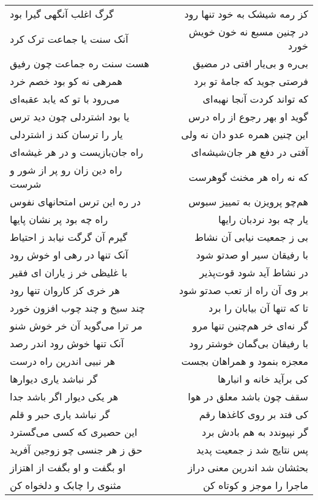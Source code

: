 \begin{center}
\begin{longtable}{l p{0.5cm} r}
\\
گرگ اغلب آنگهی گیرا بود
&&
کز رمه شیشک به خود تنها رود
\\
آنک سنت یا جماعت ترک کرد
&&
در چنین مسبع نه خون خویش خورد
\\
هست سنت ره جماعت چون رفیق
&&
بی‌ره و بی‌یار افتی در مضیق
\\
همرهی نه کو بود خصم خرد
&&
فرصتی جوید که جامهٔ تو برد
\\
می‌رود با تو که یابد عقبه‌ای
&&
که تواند کردت آنجا نهبه‌ای
\\
یا بود اشتردلی چون دید ترس
&&
گوید او بهر رجوع از راه درس
\\
یار را ترسان کند ز اشتردلی
&&
این چنین همره عدو دان نه ولی
\\
راه جان‌بازیست و در هر غیشه‌ای
&&
آفتی در دفع هر جان‌شیشه‌ای
\\
راه دین زان رو پر از شور و شرست
&&
که نه راه هر مخنث گوهرست
\\
در ره این ترس امتحانهای نفوس
&&
هم‌چو پرویزن به تمییز سبوس
\\
راه چه بود پر نشان پایها
&&
یار چه بود نردبان رایها
\\
گیرم آن گرگت نیابد ز احتیاط
&&
بی ز جمعیت نیابی آن نشاط
\\
آنک تنها در رهی او خوش رود
&&
با رفیقان سیر او صدتو شود
\\
با غلیظی خر ز یاران ای فقیر
&&
در نشاط آید شود قوت‌پذیر
\\
هر خری کز کاروان تنها رود
&&
بر وی آن راه از تعب صدتو شود
\\
چند سیخ و چند چوب افزون خورد
&&
تا که تنها آن بیابان را برد
\\
مر ترا می‌گوید آن خر خوش شنو
&&
گر نه‌ای خر هم‌چنین تنها مرو
\\
آنک تنها خوش رود اندر رصد
&&
با رفیقان بی‌گمان خوشتر رود
\\
هر نبیی اندرین راه درست
&&
معجزه بنمود و همراهان بجست
\\
گر نباشد یاری دیوارها
&&
کی برآید خانه و انبارها
\\
هر یکی دیوار اگر باشد جدا
&&
سقف چون باشد معلق در هوا
\\
گر نباشد یاری حبر و قلم
&&
کی فتد بر روی کاغذها رقم
\\
این حصیری که کسی می‌گسترد
&&
گر نپیوندد به هم بادش برد
\\
حق ز هر جنسی چو زوجین آفرید
&&
پس نتایج شد ز جمعیت پدید
\\
او بگفت و او بگفت از اهتزاز
&&
بحثشان شد اندرین معنی دراز
\\
مثنوی را چابک و دلخواه کن
&&
ماجرا را موجز و کوتاه کن
\\

\end{longtable}
\end{center}
